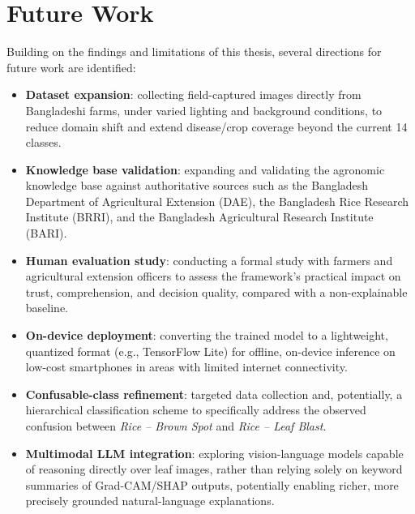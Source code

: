 \documentclass[12pt,a4paper,oneside]{report}
\begin{document}
\section{Future Work}
Building on the findings and limitations of this thesis, several directions for future work are identified:
\begin{itemize}
    \item \textbf{Dataset expansion}: collecting field-captured images directly from Bangladeshi farms, under
          varied lighting and background conditions, to reduce domain shift and extend disease/crop coverage
          beyond the current 14 classes.
    \item \textbf{Knowledge base validation}: expanding and validating the agronomic knowledge base against
          authoritative sources such as the Bangladesh Department of Agricultural Extension (DAE), the
          Bangladesh Rice Research Institute (BRRI), and the Bangladesh Agricultural Research Institute (BARI).
    \item \textbf{Human evaluation study}: conducting a formal study with farmers and agricultural extension
          officers to assess the framework's practical impact on trust, comprehension, and decision quality,
          compared with a non-explainable baseline.
    \item \textbf{On-device deployment}: converting the trained model to a lightweight, quantized format (e.g.,
          TensorFlow Lite) for offline, on-device inference on low-cost smartphones in areas with limited
          internet connectivity.
    \item \textbf{Confusable-class refinement}: targeted data collection and, potentially, a hierarchical
          classification scheme to specifically address the observed confusion between \textit{Rice -- Brown
          Spot} and \textit{Rice -- Leaf Blast}.
    \item \textbf{Multimodal LLM integration}: exploring vision-language models capable of reasoning directly
          over leaf images, rather than relying solely on keyword summaries of Grad-CAM/SHAP outputs, potentially
          enabling richer, more precisely grounded natural-language explanations.
\end{itemize}
\end{document}

